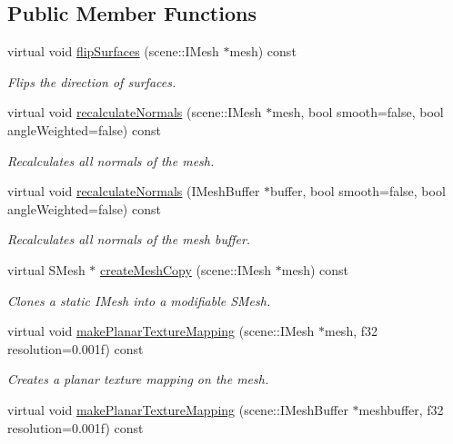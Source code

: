 \subsection*{Public Member Functions}
\begin{DoxyCompactItemize}
\item 
virtual void \hyperlink{classirr_1_1scene_1_1_c_mesh_manipulator_a761c2db306809f5be62ab46ce7eba57f}{flip\-Surfaces} (scene\-::\-I\-Mesh $\ast$mesh) const 
\begin{DoxyCompactList}\small\item\em Flips the direction of surfaces. \end{DoxyCompactList}\item 
virtual void \hyperlink{classirr_1_1scene_1_1_c_mesh_manipulator_a7ac014c657a2cff78ba107569097b151}{recalculate\-Normals} (scene\-::\-I\-Mesh $\ast$mesh, bool smooth=false, bool angle\-Weighted=false) const 
\begin{DoxyCompactList}\small\item\em Recalculates all normals of the mesh. \end{DoxyCompactList}\item 
virtual void \hyperlink{classirr_1_1scene_1_1_c_mesh_manipulator_a428c96302ec17f014092b0b9b9b3f5c8}{recalculate\-Normals} (I\-Mesh\-Buffer $\ast$buffer, bool smooth=false, bool angle\-Weighted=false) const 
\begin{DoxyCompactList}\small\item\em Recalculates all normals of the mesh buffer. \end{DoxyCompactList}\item 
virtual S\-Mesh $\ast$ \hyperlink{classirr_1_1scene_1_1_c_mesh_manipulator_ad34378f259d9f925633ca5ffbd5595e2}{create\-Mesh\-Copy} (scene\-::\-I\-Mesh $\ast$mesh) const 
\begin{DoxyCompactList}\small\item\em Clones a static I\-Mesh into a modifiable S\-Mesh. \end{DoxyCompactList}\item 
virtual void \hyperlink{classirr_1_1scene_1_1_c_mesh_manipulator_a07e2a3d91cdea31e9fb76901924e2359}{make\-Planar\-Texture\-Mapping} (scene\-::\-I\-Mesh $\ast$mesh, f32 resolution=0.\-001f) const 
\begin{DoxyCompactList}\small\item\em Creates a planar texture mapping on the mesh. \end{DoxyCompactList}\item 
\hypertarget{classirr_1_1scene_1_1_c_mesh_manipulator_aad4c71b12e22b15a3e9e031a983866df}{virtual void \hyperlink{classirr_1_1scene_1_1_c_mesh_manipulator_aad4c71b12e22b15a3e9e031a983866df}{make\-Planar\-Texture\-Mapping} (scene\-::\-I\-Mesh\-Buffer $\ast$meshbuffer, f32 resolution=0.\-001f) const }\label{classirr_1_1scene_1_1_c_mesh_manipulator_aad4c71b12e22b15a3e9e031a983866df}


\end{DoxyCompactItemize}
